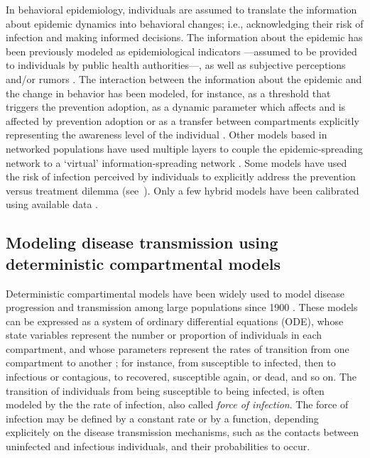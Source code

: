 In behavioral epidemiology, individuals are assumed to translate the information about epidemic dynamics into behavioral changes; i.e., acknowledging their risk of infection and making informed decisions. The information about the epidemic has been previously modeled as epidemiological indicators ---assumed to be provided to individuals by public health authorities---, as well as subjective perceptions and/or rumors \cite[]{Verelst2016}. The interaction between the information about the epidemic and the change in behavior has been modeled, for instance, as a threshold that triggers the prevention adoption, as a dynamic parameter which affects and is affected by prevention adoption or as a transfer between compartments explicitly representing the awareness level of the individual \cite[]{Verelst2016}. Other models based in networked populations have used multiple layers to couple the epidemic-spreading network to a `virtual' information-spreading network \cite[]{Wang2016}. Some models have used the risk of infection perceived by individuals to explicitly address the prevention versus treatment dilemma (see~). Only a few hybrid models have been calibrated using available data \cite[]{Verelst2016}.

							
\subsection{Modeling disease transmission using deterministic compartmental models}

Deterministic compartimental models have been widely used to model disease progression and transmission among large populations since 1900 \cite[]{Brauer2017}. These models can be expressed as a system of ordinary differential equations (ODE), whose state variables represent the number or proportion of individuals in each compartment, and whose parameters represent the rates of transition from one compartment to another \cite[]{Hethcote2000}; for instance, from susceptible to infected, then to infectious or contagious, to recovered, susceptible again, or dead, and so on. The transition of individuals from being susceptible to being infected, is often modeled by the the rate of infection, also called \textit{force of infection}. The force of infection may be defined by a constant rate or by a function, depending explicitely on the disease transmission mechanisms, such as the contacts between uninfected and infectious individuals, and their probabilities to occur. 

